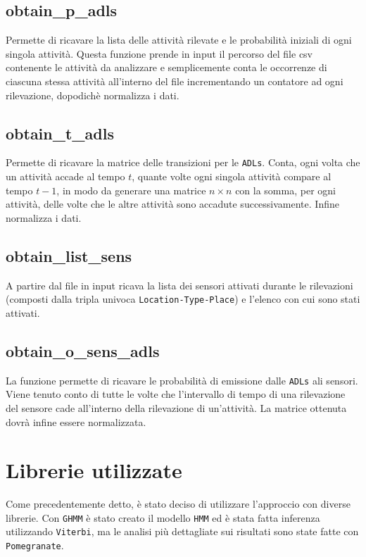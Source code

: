 \documentclass[12pt, a4paper]{scrartcl}
\begin{document}
\subsection*{obtain\_p\_adls}
Permette di ricavare la lista delle attività rilevate e le probabilità iniziali di ogni singola attività. Questa funzione prende in input il percorso del file csv contenente le attività da analizzare e semplicemente conta le occorrenze di ciascuna stessa attività all'interno del file incrementando un contatore ad ogni rilevazione, dopodichè normalizza i dati.

\subsection*{obtain\_t\_adls}
Permette di ricavare la matrice delle transizioni per le \texttt{ADLs}. Conta, ogni volta che un attività accade al tempo $t$, quante volte ogni singola attività compare al tempo $t-1$, in modo da generare una matrice $n\times n$ con la somma, per ogni attività, delle volte che le altre attività sono accadute successivamente. Infine normalizza i dati.

\subsection*{obtain\_list\_sens}
A partire dal file in input ricava la lista dei sensori attivati durante le rilevazioni (composti dalla tripla univoca \texttt{Location-Type-Place}) e l'elenco con cui sono stati attivati.

\subsection*{obtain\_o\_sens\_adls}
La funzione permette di ricavare le probabilità di emissione dalle \texttt{ADLs} ali sensori. Viene tenuto conto di tutte le volte che l'intervallo di tempo di una rilevazione del sensore cade all'interno della rilevazione di un'attività. La matrice ottenuta dovrà infine essere normalizzata.

\section*{Librerie utilizzate}
Come precedentemente detto, è stato deciso di utilizzare l'approccio con diverse librerie. Con \texttt{GHMM} è stato creato il modello \texttt{HMM} ed è stata fatta inferenza utilizzando \texttt{Viterbi}, ma le analisi più dettagliate sui risultati sono state fatte con \texttt{Pomegranate}.
\end{document}
